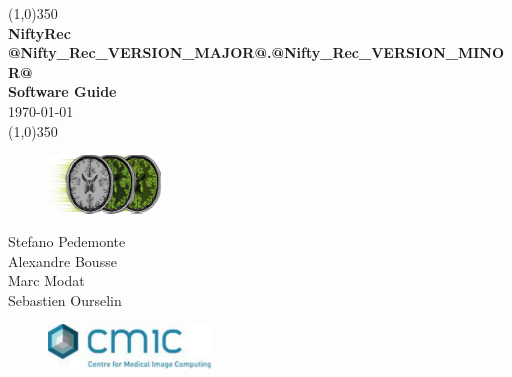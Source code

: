 \documentclass[12pt,a4paper]{report}
\begin{document}

\thispagestyle{empty}

\begin{titlepage}

\vspace*{1.0cm} 
    \begin{center}
      \line(1,0){350}\\
      \LARGE
      \textbf{NiftyRec @Nifty_Rec_VERSION_MAJOR@.@Nifty_Rec_VERSION_MINOR@}\\
      \large
      \textbf{Software Guide}\\
      \vspace{1.0cm}
      \small \today \\
      \line(1,0){350}\\
    \end{center}

    \begin{figure}[!h]
      \begin{center}
        \includegraphics[width=3.0cm]{niftyrec_logo}
      \end{center}
    \end{figure}


\vspace*{4.0cm} 
\large
\begin{flushright}
  Stefano Pedemonte\\
  Alexandre Bousse\\
  Marc Modat\\
  Sebastien Ourselin\\
\end{flushright}

\vspace*{1.5cm}
  \begin{figure}[htbp]
    \begin{flushright}
      \includegraphics[width=4.3cm]{logo_cmic}
    \end{flushright}
  \end{figure}

\end{titlepage}
\end{document}
